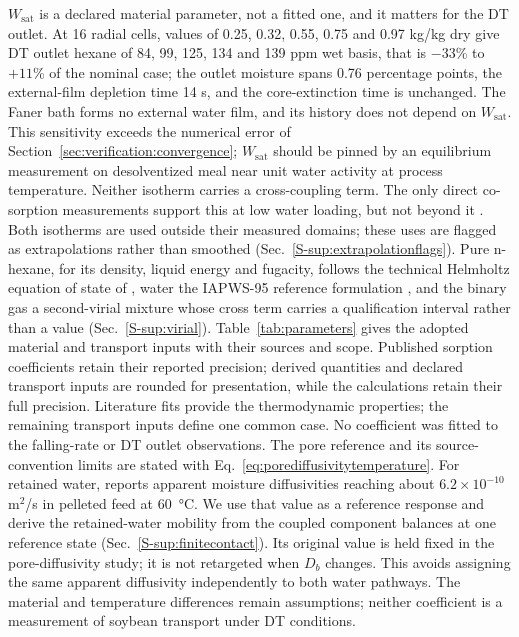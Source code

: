 $W_{\mathrm{sat}}$ is a declared material parameter, not a fitted one,
and it matters for the DT outlet. At 16 radial cells, values of 0.25,
0.32, 0.55, 0.75 and 0.97 kg/kg dry give DT outlet hexane of 84, 99, 125,
134 and 139 ppm wet basis, that is $-33$\% to $+11$\% of the nominal
case; the outlet moisture spans 0.76 percentage points, the
external-film depletion time 14 s, and the core-extinction time is
unchanged. The Faner bath forms no external water film, and its history
does not depend on $W_{\mathrm{sat}}$. This sensitivity exceeds the
numerical error of Section~\ref{sec:verification:convergence};
$W_{\mathrm{sat}}$ should be pinned by an equilibrium measurement on
desolventized meal near unit water activity at process temperature.
Neither isotherm carries a cross-coupling term. The only
direct co-sorption measurements support this at low water loading, but not beyond
it \citep{cardarelli1998thesis}. Both isotherms are used outside their measured
domains; these uses are flagged as extrapolations rather than smoothed
(Sec.~\ref*{S-sup:extrapolationflags}). Pure n-hexane, for its density,
liquid energy and fugacity, follows the technical
Helmholtz equation of state of \citet{span2003eos1,span2003eos2}, water the
IAPWS-95 reference formulation \citep{wagner2002iapws,iapws2018r695}, and the
binary gas a second-virial mixture whose cross term carries a qualification
interval rather than a value (Sec.~\ref*{S-sup:virial}). Table~\ref{tab:parameters} gives the
adopted material and transport inputs with their sources and scope.
Published sorption coefficients retain their reported precision; derived
quantities and declared transport inputs are rounded for presentation,
while the calculations retain their full precision. Literature fits provide
the thermodynamic properties; the remaining transport inputs define one
common case. No coefficient was fitted to the falling-rate or DT outlet
observations.
The pore reference and its source-convention limits are stated with
Eq.~\eqref{eq:porediffusivitytemperature}. For retained water,
\citet{touffet2026moisture} reports apparent moisture
diffusivities reaching about $6.2\times10^{-10}$ m$^2$/s in pelleted feed
at \SI{60}{\celsius}. We use that value as a reference response and derive
the retained-water mobility from the coupled component balances at one
reference state (Sec.~\ref*{S-sup:finitecontact}). Its original value is held
fixed in the pore-diffusivity study; it is not retargeted when $D_b$ changes.
This avoids assigning
the same apparent diffusivity independently to both water pathways.
The material and temperature differences remain assumptions; neither
coefficient is a measurement of soybean transport under DT conditions.


